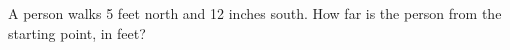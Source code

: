 A person walks 5 feet north and 12 inches south. How far is the person from the starting point, in feet?
